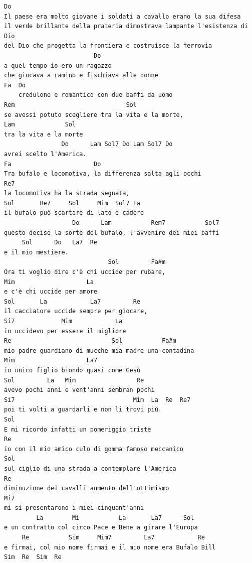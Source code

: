 \documentclass[a4paper]{article}
\begin{document}
\begin{Verbatim}[commandchars=\\\{\}]
Do
Il paese era molto giovane i soldati a cavallo erano la sua difesa
il verde brillante della prateria dimostrava lampante l'esistenza di Dio
del Dio che progetta la frontiera e costruisce la ferrovia
                         Do
a quel tempo io ero un ragazzo 
che giocava a ramino e fischiava alle donne
Fa  Do
    credulone e romantico con due baffi da uomo
Rem                               Sol             
se avessi potuto scegliere tra la vita e la morte, 
Lam              Sol 
tra la vita e la morte
                Do      Lam Sol7 Do Lam Sol7 Do
avrei scelto l'America.
Fa                       Do
Tra bufalo e locomotiva, la differenza salta agli occhi
Re7 
la locomotiva ha la strada segnata, 
Sol       Re7     Sol     Mim  Sol7 Fa
il bufalo può scartare di lato e cadere
                   Do      Lam           Rem7           Sol7
questo decise la sorte del bufalo, l'avvenire dei miei baffi
     Sol      Do   La7  Re
e il mio mestiere.
                             Sol         Fa#m
Ora ti voglio dire c'è chi uccide per rubare, 
Mim                    La 
e c'è chi uccide per amore
Sol       La            La7         Re   
il cacciatore uccide sempre per giocare, 
Si7             Mim            La
io uccidevo per essere il migliore
Re                            Sol           Fa#m
mio padre guardiano di mucche mia madre una contadina
Mim                    La7
io unico figlio biondo quasi come Gesù
Sol         La   Mim                 Re
avevo pochi anni e vent'anni sembran pochi
Si7                                 Mim  La  Re  Re7
poi ti volti a guardarli e non li trovi più.
Sol
E mi ricordo infatti un pomeriggio triste
Re
io con il mio amico culo di gomma famoso meccanico
Sol
sul ciglio di una strada a contemplare l'America
Re
diminuzione dei cavalli aumento dell'ottimismo
Mi7                                      
mi si presentarono i miei cinquant'anni 
         La        Mi           La       La7      Sol 
e un contratto col circo Pace e Bene a girare l'Europa
     Re           Sim     Mim7         La7            Re
e firmai, col mio nome firmai e il mio nome era Bufalo Bill
Sim  Re  Sim  Re
\end{Verbatim}
\newpage
\end{document}
